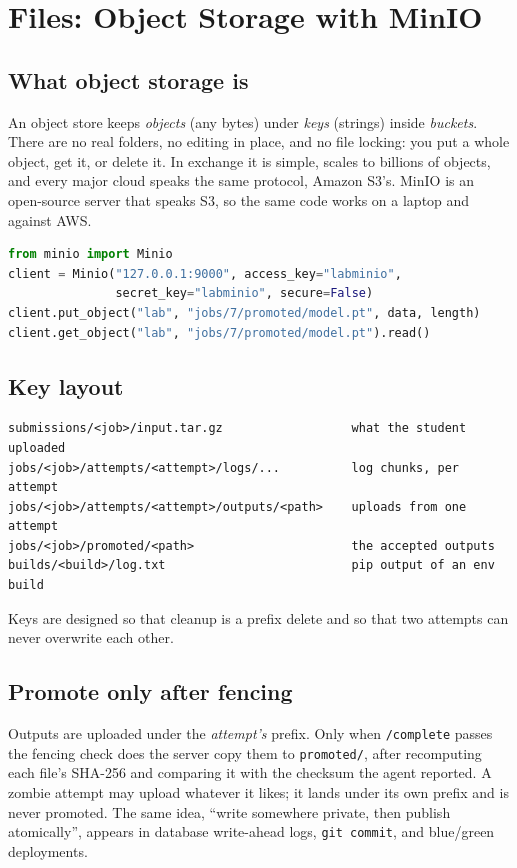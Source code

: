 \section{Files: Object Storage with MinIO}

\subsection{What object storage is}

An object store keeps \emph{objects} (any bytes) under \emph{keys} (strings)
inside \emph{buckets}. There are no real folders, no editing in place, and no
file locking: you put a whole object, get it, or delete it. In exchange it is
simple, scales to billions of objects, and every major cloud speaks the same
protocol, Amazon S3's. MinIO is an open-source server that speaks S3, so the
same code works on a laptop and against AWS.

\begin{lstlisting}[language=Python]
from minio import Minio
client = Minio("127.0.0.1:9000", access_key="labminio",
               secret_key="labminio", secure=False)
client.put_object("lab", "jobs/7/promoted/model.pt", data, length)
client.get_object("lab", "jobs/7/promoted/model.pt").read()
\end{lstlisting}

\subsection{Key layout}

\begin{verbatim}
submissions/<job>/input.tar.gz                  what the student uploaded
jobs/<job>/attempts/<attempt>/logs/...          log chunks, per attempt
jobs/<job>/attempts/<attempt>/outputs/<path>    uploads from one attempt
jobs/<job>/promoted/<path>                      the accepted outputs
builds/<build>/log.txt                          pip output of an env build
\end{verbatim}

Keys are designed so that cleanup is a prefix delete and so that two attempts
can never overwrite each other.

\subsection{Promote only after fencing}

Outputs are uploaded under the \emph{attempt's} prefix. Only when
\texttt{/complete} passes the fencing check does the server copy them to
\texttt{promoted/}, after recomputing each file's SHA-256 and comparing it with
the checksum the agent reported. A zombie attempt may upload whatever it likes;
it lands under its own prefix and is never promoted. The same idea, ``write
somewhere private, then publish atomically'', appears in database write-ahead
logs, \texttt{git commit}, and blue/green deployments.

